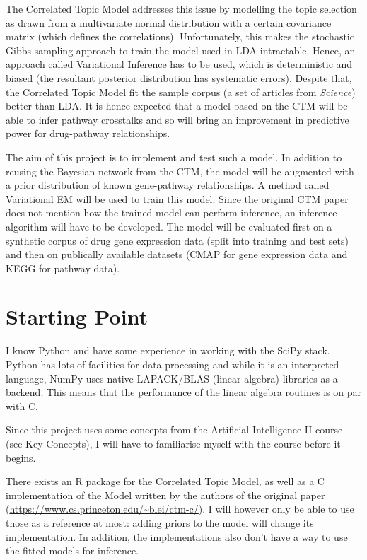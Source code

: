\documentclass[12pt,a4]{article}
\begin{document}
The Correlated Topic Model\cite{2007} addresses this issue by modelling the topic selection as drawn from a multivariate normal distribution with a certain covariance matrix (which defines the correlations). Unfortunately, this makes the stochastic Gibbs sampling approach to train the model used in LDA intractable. Hence, an approach called Variational Inference has to be used, which is deterministic and biased (the resultant posterior distribution has systematic errors). Despite that, the Correlated Topic Model fit the sample corpus (a set of articles from {\em Science}) better than LDA\cite{2007}. It is hence expected that a model based on the CTM will be able to infer pathway crosstalks and so will bring an improvement in predictive power for drug-pathway relationships.

The aim of this project is to implement and test such a model. In addition to reusing the Bayesian network from the CTM, the model will be augmented with a prior distribution of known gene-pathway relationships. A method called Variational EM will be used to train this model. Since the original CTM paper does not mention how the trained model can perform inference, an inference algorithm will have to be developed. The model will be evaluated first on a synthetic corpus of drug gene expression data (split into training and test sets) and then on publically available datasets (CMAP for gene expression data and KEGG for pathway data).

\section*{Starting Point}

I know Python and have some experience in working with the SciPy stack. Python has lots of facilities for data processing and while it is an interpreted language, NumPy uses native LAPACK/BLAS (linear algebra) libraries as a backend. This means that the performance of the linear algebra routines is on par with C.

Since this project uses some concepts from the Artificial Intelligence II course (see Key Concepts), I will have to familiarise myself with the course before it begins.

There exists an R package for the Correlated Topic Model, as well as a C implementation of the Model written by the authors of the original paper (\url{https://www.cs.princeton.edu/~blei/ctm-c/}). I will however only be able to use those as a reference at most: adding priors to the model will change its implementation. In addition, the implementations also don't have a way to use the fitted models for inference.
\end{document}
